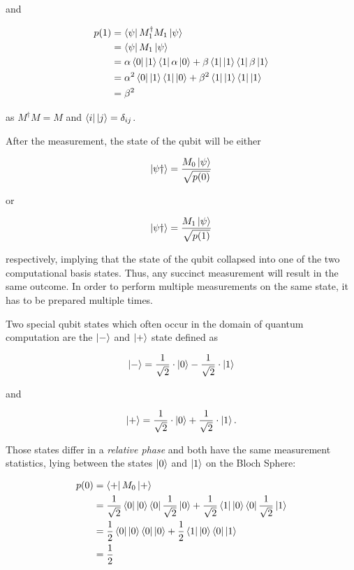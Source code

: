 and

\begin{align}
  p(1) &= \Bra{\psi} M_1^{\dagger} M_1 \Ket{\psi} \\
       &= \Bra{\psi} M_1 \Ket{\psi} \\
       &= \alpha \Bra{0} \Ket{1} \Bra{1} \alpha \Ket{0} + \beta \Bra{1} \Ket{1} \Bra{1} \beta \Ket{1} \\
       &= \alpha^2 \Bra{0} \Ket{1} \Bra{1} \Ket{0} + \beta^2 \Bra{1} \Ket{1} \Bra{1} \Ket{1} \\
       &= \beta^2
\end{align}

as $M^{\dagger}M = M$ and $\Bra{i} \Ket{j} = \delta_{ij}$.

After the measurement, the state of the qubit will be either

\begin{equation}
  \Ket{\psi\dagger} = \frac{M_0 \Ket{\psi}}{\sqrt{p(0)}}
\end{equation}

or

\begin{equation}
  \Ket{\psi\dagger} = \frac{M_1 \Ket{\psi}}{\sqrt{p(1)}}
\end{equation}

respectively, implying that the state of the qubit collapsed into one of the two computational
basis states. Thus, any succinct measurement will result in the same outcome.
In order to perform multiple measurements on the same state, it has to be prepared multiple times.

Two special qubit states which often occur in the domain of quantum computation are the $\Ket{-}$ and $\Ket{+}$ state defined as

\begin{equation}
  \Ket{-} = \frac{1}{\sqrt{2}} \cdot \Ket{0} - \frac{1}{\sqrt{2}} \cdot \Ket{1}
\end{equation}

and

\begin{equation}
  \Ket{+} = \frac{1}{\sqrt{2}} \cdot \Ket{0} + \frac{1}{\sqrt{2}} \cdot \Ket{1}.
\end{equation}

Those states differ in a \textit{relative phase} and both have the same measurement statistics, lying between the states $\Ket{0}$ and
$\Ket{1}$ on the Bloch Sphere:

\begin{align}
  p(0) &= \Bra{+} M_0 \Ket{+} \\
       &= \frac{1}{\sqrt{2}} \Bra{0} \Ket{0} \Bra{0} \frac{1}{\sqrt{2}} \Ket{0} + \frac{1}{\sqrt{2}} \Bra{1} \Ket{0} \Bra{0} \frac{1}{\sqrt{2}} \Ket{1} \\
       &= \frac{1}{2} \Bra{0} \Ket{0} \Bra{0} \Ket{0} + \frac{1}{2} \Bra{1} \Ket{0} \Bra{0} \Ket{1} \\
       &= \frac{1}{2}
\end{align}


